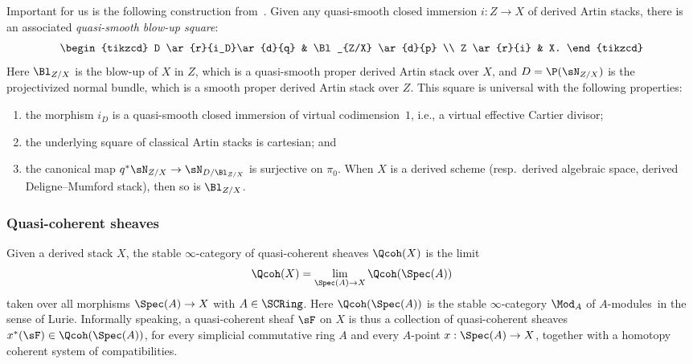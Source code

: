 Important for us is the following construction from~\cite{KhanBlowup}. Given any quasi-smooth closed immersion $i : Z \to X$ of derived Artin stacks, there is an associated \emph{quasi-smooth blow-up square}:
\begin{equation}\label{eq:qsbl square}
\begin{tikzcd}
D \ar{r}{i_D}\ar{d}{q} & \Bl_{Z/X} \ar{d}{p}
\\
Z \ar{r}{i} & X.
\end{tikzcd}
\end{equation}
Here $\Bl_{Z/X}$ is the blow-up of $X$ in $Z$, which is a quasi-smooth proper derived Artin stack over $X$, and $D = \P(\sN_{Z/X})$ is the projectivized normal bundle, which is a smooth proper derived Artin stack over $Z$. This square is universal with the following properties:
\begin{enumerate}\alphenumi
\item the morphism $i_D$ is a quasi-smooth closed immersion of virtual codimension~$1$, i.e., a virtual effective Cartier divisor;
\item the underlying square of classical Artin stacks is cartesian; and
\item the canonical map $q^*\sN_{Z/X} \to \sN_{D/\Bl_{Z/X}}$ is surjective on $\pi_0$. When $X$ is a derived scheme (resp.~derived algebraic space, derived Deligne--Mumford stack), then so is $\Bl_{Z/X}$.
\end{enumerate}

\subsubsection{Quasi-coherent sheaves}

Given a derived stack $X$, the stable $\infty$-category of quasi-coherent sheaves $\Qcoh(X)$ is the limit
\[
\Qcoh(X) = \lim_{\Spec(A) \to X} \Qcoh(\Spec(A))
\]
taken over all morphisms $\Spec(A) \to X$ with $A \in \SCRing$. Here $\Qcoh(\Spec(A))$ is the stable $\infty$-category $\Mod_A$ of $A$-modules\footnotemark~in the sense of Lurie.
 Informally speaking, a quasi-coherent sheaf $\sF$ on $X$ is thus a collection of quasi-coherent sheaves $x^*(\sF) \in \Qcoh(\Spec(A))$, for every simplicial commutative ring $A$ and every $A$-point $x : \Spec(A) \to X$, together with a homotopy coherent system of compatibilities.

